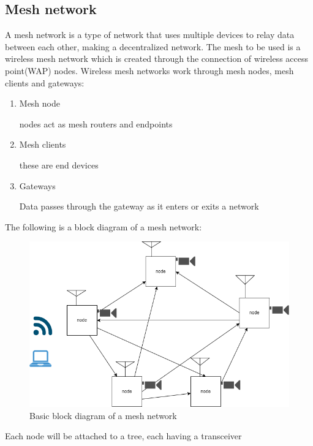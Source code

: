 	\subsection{Mesh network}
	A mesh network is a type of network that uses multiple devices to relay data between each other, making a decentralized network.
	The mesh to be used is a wireless mesh network which is  created through the connection of wireless access point(WAP) nodes.
	Wireless mesh networks work through mesh nodes, mesh clients and gateways:
	\begin{enumerate}
		\item Mesh node

		nodes act as mesh routers and endpoints
		\item Mesh clients

		these are  end devices
		\item Gateways

		Data passes through the gateway as it enters or exits a network
	\end{enumerate}
	The following is a block diagram of a mesh network:
	\begin{figure}[h!]
	    \begin{center}			
	    \includegraphics[width=0.5\linewidth]{Images/basic mesh network diagram.png}\par
	    \caption{Basic block diagram of a mesh network}
	
	    \label{Basic block diagram of a mesh network}
	     \end{center}
	\end{figure}

	Each node will be attached to a tree, each having a transceiver